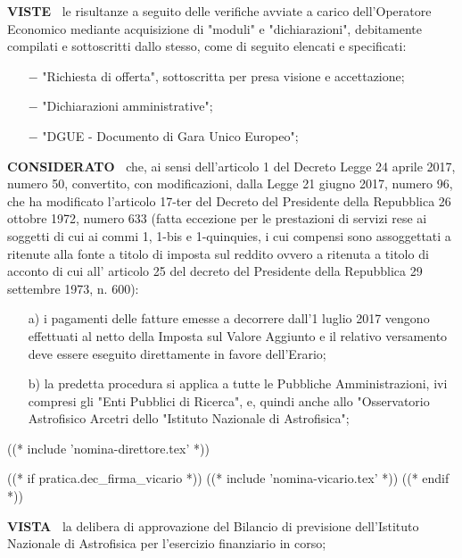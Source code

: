 \textbf{VISTE~}	le risultanze a seguito delle verifiche avviate a
carico dell'Operatore Economico mediante acquisizione di "moduli" e
"dichiarazioni", debitamente compilati e sottoscritti dallo stesso, come
di seguito elencati e specificati: 

\begin{itemize}
\item[$-$] "Richiesta di offerta", sottoscritta per presa visione e accettazione;

\item[$-$] "Dichiarazioni amministrative";

\item[$-$] "DGUE - Documento di Gara Unico Europeo"; 
\end{itemize}

\textbf{CONSIDERATO~} che, ai sensi dell'articolo 1 del
Decreto Legge 24 aprile 2017, numero 50, convertito, con modificazioni,
dalla Legge 21 giugno 2017, numero 96, che ha modificato l'articolo
17-ter del Decreto del Presidente della Repubblica 26 ottobre 1972, numero
633 (fatta eccezione per le prestazioni di servizi rese ai soggetti di
cui ai commi 1, 1-bis e 1-quinquies, i cui compensi sono assoggettati a
ritenute alla fonte a titolo di imposta sul reddito ovvero a ritenuta a
titolo di acconto di cui all' articolo 25 del decreto del Presidente della
Repubblica 29 settembre 1973, n. 600):

\begin{enumerate}

\item[a)] i pagamenti delle fatture
emesse a decorrere dall'1 luglio 2017 vengono effettuati al netto della
Imposta sul Valore Aggiunto e il relativo versamento deve essere eseguito
direttamente in favore dell'Erario;

\item[b)] la predetta procedura si
applica a tutte le Pubbliche Amministrazioni, ivi compresi gli "Enti
Pubblici di Ricerca", e, quindi anche allo "Osservatorio Astrofisico
Arcetri dello "Istituto Nazionale di Astrofisica";
\end{enumerate}

((* include 'nomina-direttore.tex' *))

((* if pratica.dec_firma_vicario *))
((* include 'nomina-vicario.tex' *))
((* endif *))

\textbf{VISTA~}	la delibera di approvazione del Bilancio di previsione
dell'Istituto Nazionale di Astrofisica per l'esercizio finanziario
 in corso;

